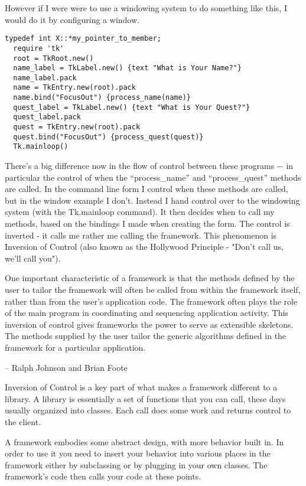 \documentclass{book}
\begin{document}
However if I were were to use a windowing system to do something like this, I would do it by configuring a window.

\begin{lstlisting}
typedef int X::*my_pointer_to_member;
  require 'tk'
  root = TkRoot.new()
  name_label = TkLabel.new() {text "What is Your Name?"}
  name_label.pack
  name = TkEntry.new(root).pack
  name.bind("FocusOut") {process_name(name)}
  quest_label = TkLabel.new() {text "What is Your Quest?"}
  quest_label.pack
  quest = TkEntry.new(root).pack
  quest.bind("FocusOut") {process_quest(quest)}
  Tk.mainloop()
\end{lstlisting}
There's a big difference now in the flow of control between these programs $-$ in particular the control of when the ``process\_name'' and ``process\_quest'' methods are called.
In the command line form I control when these methods are called, but in the window example I don't. 
Instead I hand control over to the windowing system (with the Tk.mainloop command).
It then decides when to call my methods, based on the bindings I made when creating the form. 
The control is inverted - it calls me rather me calling the framework. 
This phenomenon is Inversion of Control (also known as the Hollywood Principle - "Don't call us, we'll call you").

    One important characteristic of a framework is that the methods defined by the user to tailor the framework will often be called from within the framework itself, 
    rather than from the user's application code.
    The framework often plays the role of the main program in coordinating and sequencing application activity. 
    This inversion of control gives frameworks the power to serve as extensible skeletons.
    The methods supplied by the user tailor the generic algorithms defined in the framework for a particular application.

    -- Ralph Johnson and Brian Foote

Inversion of Control is a key part of what makes a framework different to a library. 
A library is essentially a set of functions that you can call, these days usually organized into classes.
Each call does some work and returns control to the client.

A framework embodies some abstract design, with more behavior built in.
In order to use it you need to insert your behavior into various places in the framework either by subclassing or by plugging in your own classes. 
The framework's code then calls your code at these points.
\end{document}
